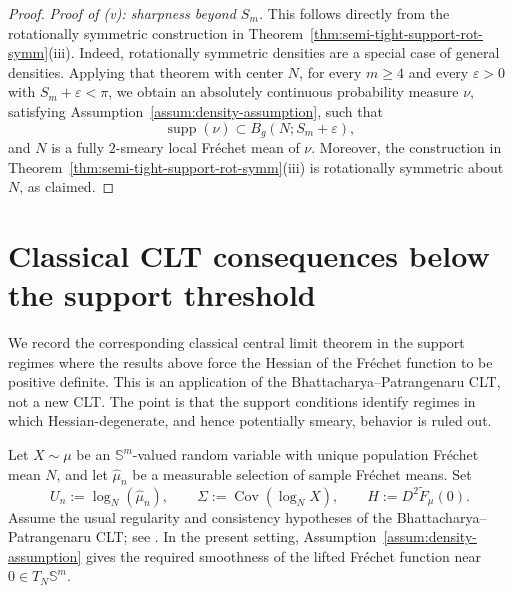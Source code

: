 \documentclass{amsart}
\theoremstyle{definition}
\theoremstyle{remark}
\newcommand\0{\boldsymbol{0}}
\begin{document}
\begin{proof}
\emph{Proof of (v): sharpness beyond \(S_m\).}
This follows directly from the rotationally symmetric construction in Theorem~\ref{thm:semi-tight-support-rot-symm}(iii). Indeed, rotationally symmetric densities are a special case of general densities. Applying that theorem with center \(N\), for every \(m\ge4\) and every \(\varepsilon>0\) with \(S_m+\varepsilon<\pi\), we obtain an absolutely continuous probability measure \(\nu\), satisfying Assumption~\ref{assum:density-assumption}, such that
\[
\operatorname{supp}(\nu)\subset B_g(N;S_m+\varepsilon),
\]
and \(N\) is a fully \(2\)-smeary local Fréchet mean of \(\nu\). Moreover, the construction in Theorem~\ref{thm:semi-tight-support-rot-symm}(iii) is rotationally symmetric about \(N\), as claimed.


\end{proof}

\section{Classical CLT consequences below the support threshold}
\label{scn:bpclt-consequences}

We record the corresponding classical central limit theorem in the support regimes where the results above force the Hessian of the Fr\'echet function to be positive definite. This is an application of the Bhattacharya--Patrangenaru CLT, not a new CLT. The point is that the support conditions identify regimes in which Hessian-degenerate, and hence potentially smeary, behavior is ruled out.

Let \(X\sim\mu\) be an \(\mathbb S^m\)-valued random variable with unique population Fr\'echet mean \(N\), and let \(\hat\mu_n\) be a measurable selection of sample Fr\'echet means. Set
\[
    U_n:=\log_N(\hat\mu_n),
    \qquad
    \Sigma:=\operatorname{Cov}(\log_N X),
    \qquad
    H:=D^2\widetilde F_\mu(0).
\]
Assume the usual regularity and consistency hypotheses of the Bhattacharya--Patrangenaru CLT; see \citet{BP,BP2}. In the present setting, Assumption~\ref{assum:density-assumption} gives the required smoothness of the lifted Fr\'echet function near \(0\in T_N\mathbb S^m\).
\end{document}
